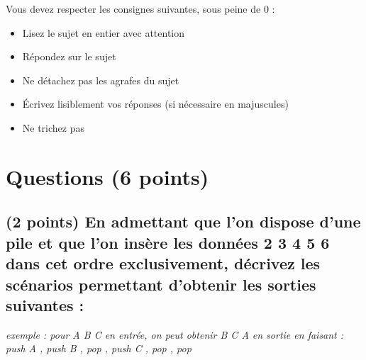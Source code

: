 \documentclass[11pt,a4paper]{article}
\begin{document}
\MakeExamTitle                   %


\bigskip

Vous devez respecter les consignes suivantes, sous peine de 0 :

\begin{itemize}
\item Lisez le sujet en entier avec attention
\item Répondez sur le sujet
\item Ne détachez pas les agrafes du sujet
\item \'Ecrivez lisiblement vos réponses (si nécessaire en majuscules)
\item Ne trichez pas
\end{itemize}

\bigskip

\vfillFirst

\section{Questions (6 points)}

\bigskip

\subsection{(2 points) En admettant que l'on dispose d'une pile et que l'on insère les données  2 3 4 5 6 \fg{} dans cet ordre exclusivement, décrivez les scénarios permettant d'obtenir les sorties suivantes : }

\bigskip

\begin{center}
\noindent \textit{exemple : pour \og A B C \fg{} en entrée, on peut obtenir \og B C A \fg{} en sortie en faisant : \linebreak
\og push A \fg, \og push B \fg, \og pop \fg, \og push C \fg, \og pop \fg, \og pop \fg }
\end{center}
\end{document}
